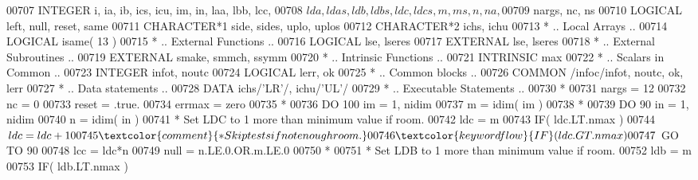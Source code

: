 \begin{DoxyCode}
00707       \textcolor{keywordtype}{INTEGER}            i, ia, ib, ics, icu, im, in, laa, lbb, lcc,
00708      $                   lda, ldas, ldb, ldbs, ldc, ldcs, m, ms, n, na,
00709      $                   nargs, nc, ns
00710       \textcolor{keywordtype}{LOGICAL}            left, null, reset, same
00711       \textcolor{keywordtype}{CHARACTER*1}        side, sides, uplo, uplos
00712       \textcolor{keywordtype}{CHARACTER*2}        ichs, ichu
00713 \textcolor{comment}{*     .. Local Arrays ..}
00714       \textcolor{keywordtype}{LOGICAL}            isame( 13 )
00715 \textcolor{comment}{*     .. External Functions ..}
00716       \textcolor{keywordtype}{LOGICAL}            lse, lseres
00717       \textcolor{keywordtype}{EXTERNAL}           lse, lseres
00718 \textcolor{comment}{*     .. External Subroutines ..}
00719       \textcolor{keywordtype}{EXTERNAL}           smake, smmch, ssymm
00720 \textcolor{comment}{*     .. Intrinsic Functions ..}
00721       \textcolor{keywordtype}{INTRINSIC}          max
00722 \textcolor{comment}{*     .. Scalars in Common ..}
00723       \textcolor{keywordtype}{INTEGER}            infot, noutc
00724       \textcolor{keywordtype}{LOGICAL}            lerr, ok
00725 \textcolor{comment}{*     .. Common blocks ..}
00726       \textcolor{keyword}{COMMON}             /infoc/infot, noutc, ok, lerr
00727 \textcolor{comment}{*     .. Data statements ..}
00728       \textcolor{keyword}{DATA}               ichs/\textcolor{stringliteral}{'LR'}/, ichu/\textcolor{stringliteral}{'UL'}/
00729 \textcolor{comment}{*     .. Executable Statements ..}
00730 \textcolor{comment}{*}
00731       nargs = 12
00732       nc = 0
00733       reset = .true.
00734       errmax = zero
00735 \textcolor{comment}{*}
00736       \textcolor{keywordflow}{DO} 100 im = 1, nidim
00737          m = idim( im )
00738 \textcolor{comment}{*}
00739          \textcolor{keywordflow}{DO} 90 in = 1, nidim
00740             n = idim( in )
00741 \textcolor{comment}{*           Set LDC to 1 more than minimum value if room.}
00742             ldc = m
00743             \textcolor{keywordflow}{IF}( ldc.LT.nmax )
00744      $         ldc = ldc + 1
00745 \textcolor{comment}{*           Skip tests if not enough room.}
00746             \textcolor{keywordflow}{IF}( ldc.GT.nmax )
00747      $         \textcolor{keywordflow}{GO TO} 90
00748             lcc = ldc*n
00749             null = n.LE.0.OR.m.LE.0
00750 \textcolor{comment}{*}
00751 \textcolor{comment}{*           Set LDB to 1 more than minimum value if room.}
00752             ldb = m
00753             \textcolor{keywordflow}{IF}( ldb.LT.nmax )

\end{DoxyCode}
